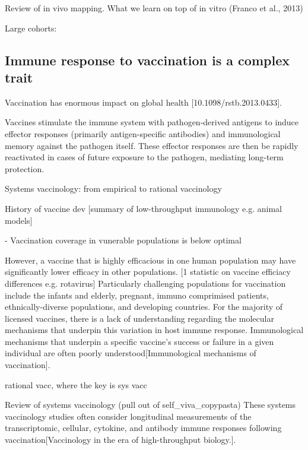 \begin{outline}
Review of in vivo mapping.
What we learn on top of in vitro
(Franco et al., 2013)

Large cohorts: 

\subsection{Immune response to vaccination is a complex trait}

Vaccination has enormous impact on global health [10.1098/rstb.2013.0433].

Vaccines stimulate the immune system with pathogen-derived antigens to induce effector responses (primarily antigen-specific antibodies) and immunological memory against the pathogen itself.
These effector responses are then be rapidly reactivated in cases of future exposure to the pathogen, mediating long-term protection.

Systems vaccinology: from empirical to rational vaccinology


    History of vaccine dev
    [summary of low-throughput immunology e.g. animal models]  

    - Vaccination coverage in vunerable populations is below optimal

    However, a vaccine that is highly efficacious in one human population may have significantly lower efficacy in other populations.
    [1 statistic on vaccine efficiacy differences e.g. rotavirus]
    Particularly challenging populations for vaccination include the infants and elderly, pregnant, immuno comprimised patients, ethnically-diverse populations, and developing countries.
    For the majority of licensed vaccines, there is a lack of understanding regarding the molecular mechanisms that underpin this variation in host immune response.
    Immunological mechanisms that underpin a specific vaccine's success or failure in a given individual are often poorly understood[Immunological mechanisms of vaccination]. 

    rational vacc, where the key is sys vacc

    Review of systems vaccinology (pull out of self\_viva\_copypasta)
    These systems vaccinology studies often consider longitudinal measurements of the transcriptomic, cellular, cytokine, and antibody immune responses following vaccination[Vaccinology in the era of high-throughput biology.].


\end{outline}
